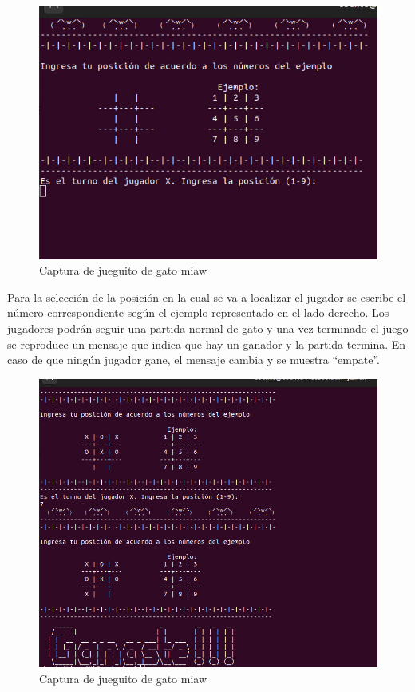 \documentclass[12pt,a4paper]{article}
\begin{document}
\begin{figure}[H]
    \centering
    \includegraphics[width=\textwidth]{img/2.jpeg}
    \caption{Captura de jueguito de gato miaw}
    \label{gato1}
\end{figure}

\noindent Para la selección de la posición en la cual se va a localizar el jugador se escribe el número correspondiente según el ejemplo representado en el lado derecho. Los jugadores podrán seguir una partida normal de gato y una vez terminado el juego se reproduce un mensaje que indica que hay un ganador y la partida termina. En caso de que ningún jugador gane, el mensaje cambia y se muestra “empate”.

\begin{figure}[H]
    \centering
    \includegraphics[width=\textwidth]{img/3.jpeg}
    \caption{Captura de jueguito de gato miaw}
    \label{gato2}
\end{figure}
\end{document}
